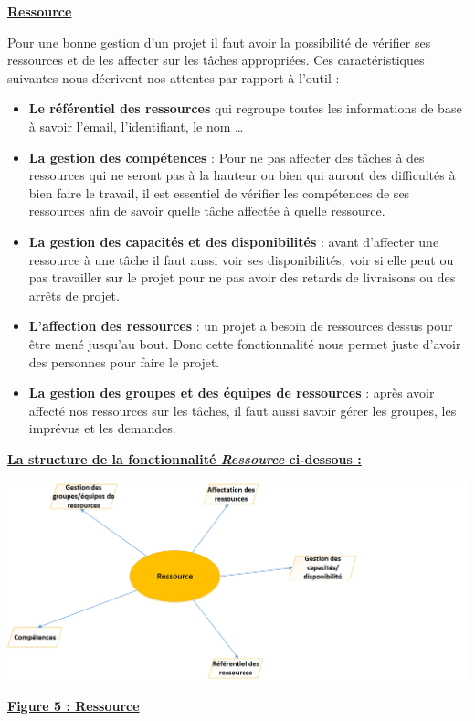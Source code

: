 \documentclass[11pt]{report}
\begin{document}
\begin{center}
\underline{ \textbf{Ressource} }
\end{center}
\hspace{1cm} Pour une bonne gestion d’un projet il faut avoir la possibilité de vérifier ses ressources et de les affecter sur les tâches appropriées. Ces caractéristiques suivantes nous décrivent nos attentes par rapport à l’outil :
\begin{itemize}
	\item \textbf{Le référentiel des ressources} qui regroupe toutes les informations de base à savoir l’email, l’identifiant, le nom …
	
	\item \textbf{La gestion des compétences} : Pour ne pas affecter des tâches à des ressources qui ne seront pas à la hauteur ou bien qui auront des difficultés à bien faire le travail, il est essentiel de vérifier les compétences de ses ressources afin de savoir quelle tâche affectée à quelle ressource. 

	\item \textbf{La gestion des capacités et des disponibilités} : avant d’affecter une ressource à une tâche il faut aussi voir ses disponibilités, voir si elle peut ou pas travailler sur le projet pour ne pas avoir des retards de livraisons ou des arrêts de projet. 

	\item \textbf{L’affection des ressources} :  un projet a besoin de ressources dessus pour être mené jusqu’au bout. Donc cette fonctionnalité nous permet juste d’avoir des personnes pour faire le projet.

	\item \textbf{La gestion des groupes et des équipes de ressources} : après avoir affecté nos ressources sur les tâches, il faut aussi savoir gérer les groupes, les imprévus et les demandes.
\end{itemize}

\begin{center}
\underline{\textbf{La structure de la fonctionnalité \textit{Ressource} ci-dessous :}}
\end{center}
\begin{center}
\includegraphics[scale=0.7]{images/figure5.png} 
\quad

\underline{\textbf{Figure 5 : Ressource}}
\end{center}
\end{document}
